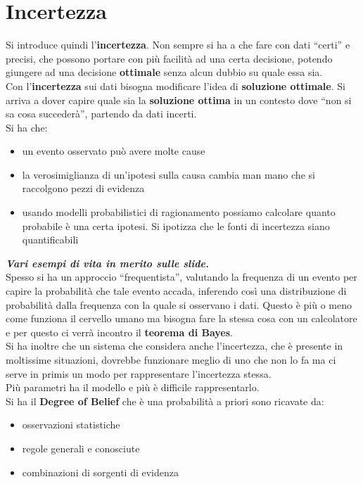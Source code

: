 \documentclass[a4paper,12pt, oneside]{book}
\begin{document}
\section{Incertezza}
Si introduce quindi l'\textbf{incertezza}. Non sempre si ha a che fare con dati
``certi'' e precisi, che possono portare con più facilità ad una certa
decisione, potendo giungere ad una decisione \textbf{ottimale} senza alcun
dubbio su quale essa sia.\\
Con l'\textbf{incertezza} sui dati bisogna modificare l'idea di
\textbf{soluzione ottimale}. Si arriva a dover capire quale sia la
\textbf{soluzione ottima} in un contesto dove ``non si sa cosa succederà'',
partendo da dati incerti.\\
Si ha che:
\begin{itemize}
  \item un evento osservato può avere molte cause
  \item la verosimiglianza di un'ipotesi sulla causa cambia man mano che si
  raccolgono pezzi di evidenza
  \item usando modelli probabilistici di ragionamento possiamo calcolare quanto
  probabile è una certa ipotesi. Si ipotizza che le fonti di incertezza siano
  quantificabili
\end{itemize}
\textbf{\textit{Vari esempi di vita in merito sulle slide.}}\\
Spesso si ha un approccio ``frequentista'', valutando la frequenza di un evento
per capire la probabilità che tale evento accada, inferendo così una
distribuzione di probabilità dalla frequenza con la quale si osservano i
dati. Questo è più o meno come funziona il cervello umano ma bisogna fare la
stessa cosa con un calcolatore e per questo ci verrà incontro il \textbf{teorema
  di Bayes}.\\
Si ha inoltre che un sistema che considera anche l'incertezza, che è presente in
moltissime situazioni, dovrebbe funzionare meglio di uno che non lo fa ma ci
serve in primis un modo per rappresentare l'incertezza stessa. \\
Più parametri ha il modello e più è difficile rappresentarlo.\\
Si ha il \textbf{Degree of Belief} che è una probabilità a priori sono ricavate
da:
\begin{itemize}
  \item osservazioni statistiche
  \item regole generali e conosciute
  \item combinazioni di sorgenti di evidenza
\end{itemize}
\end{document}
